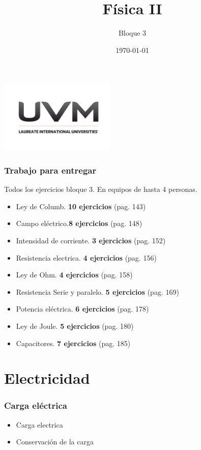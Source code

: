 \documentclass[handout]{beamer}
\title{Física II}
\author{Bloque 3}
\institute[UVM]{4\textdegree \hspace{2pt} cuatrimestre.}
\date{\today}
\begin{document}
\begin{frame}[noframenumbering]
  \titlepage
  \begin{center}
    \includegraphics[width=5.5cm]{uvm1}    
  \end{center}  
\end{frame}


\begin{frame}
  \frametitle{Trabajo para entregar}
  \begin{block}{}
    Todos los ejercicios bloque 3. En equipos de hasta 4 personas.
  \end{block}
  \begin{itemize}
  \item Ley de Columb. \textbf{10 ejercicios} (pag. 143)
  \item Campo eléctrico.\textbf{8 ejercicios} (pag. 148)
  \item Intensidad de corriente. \textbf{3 ejercicios} (pag. 152)
  \item Resistencia electrica. \textbf{4 ejercicios} (pag. 156)
  \item Ley de Ohm. \textbf{4 ejercicios} (pag. 158)
  \item Resistencia Serie y paralelo. \textbf{5 ejercicios} (pag. 169)
  \item Potencia eléctrica. \textbf{6 ejercicios} (pag. 178)
  \item Ley de Joule. \textbf{5 ejercicios} (pag. 180) 
  \item Capacitores. \textbf{7 ejercicios} (pag. 185) 
  \end{itemize}
\end{frame}



\section{Electricidad}

\begin{frame}[allowframebreaks,t]
  \frametitle{Carga eléctrica}
  \begin{itemize}
  \item Carga electrica
  \item Conservación de la carga
  \end{itemize}

\end{frame}
\end{document}
